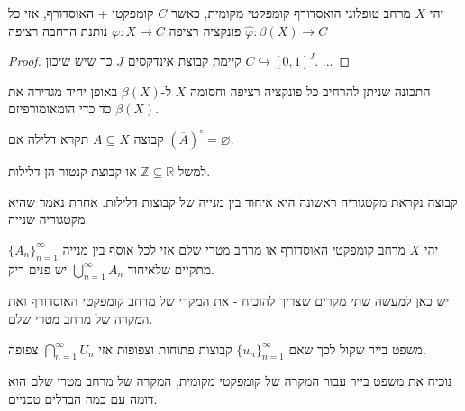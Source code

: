 \documentclass{tstextbook}
\begin{document}
\begin{proposition}
יהי \(X\) מרחב טופלוגי הואסדורף קומפקטי מקומית, כאשר \(C\) קומפקטי + האוסדורף, אזי כל פונקציה רציפה \(\varphi:X\to C\) נותנת הרחבה רציפה \(\hat{\varphi}:\beta(X)\to C\)

\end{proposition}
\begin{proof}
קיימת קבוצת אינדקסים \(J\) כך שיש שיכון \(C\hookrightarrow[0,1]^{J}\). 
...

\end{proof}
\begin{proposition}
התכונה שניתן להרחיב כל פונקציה רציפה וחסומה \(X\) ל-\(\beta(X)\) באופן יחיד מגדירה את \(\beta(X)\) כד כדי הומאומורפיזם.

\end{proposition}
\begin{definition}
קבוצה \(A\subseteq X\) תקרא דלילה אם \((\overline{A})^{\circ}=\varnothing\). 

\end{definition}
\begin{example}
למשל \(\mathbb{Z}\subseteq \mathbb{R}\) או קבוצת קנטור הן דלילות.

\end{example}
\begin{definition}
קבוצה נקראת מקטגוריה ראשונה היא איחוד בין מנייה של קבוצות דלילות. אחרת נאמר שהיא מקטגוריה שנייה.

\end{definition}
\begin{theorem}[בייר]
יהי \(X\) מרחב קומפקטי האוסדורף או מרחב מטרי שלם
אזי לכל אוסף בין מנייה \(\{ A_{n} \}_{n=1}^{\infty}\) מתקיים שלאיחוד \(\bigcup_{n=1}^{\infty}A_{n}\) יש פנים ריק.

\end{theorem}
יש כאן למעשה שתי מקרים שצריך להוכיח - את המקרי של מרחב קומפקטי האוסדורף ואת המקרה של מרחב מטרי שלם. 

\begin{proposition}
משפט בייר שקול לכך שאם \(\{ u_{n} \}_{n=1}^{\infty}\) קבוצות פתוחות וצפופות אזי \(\bigcap_{n=1}^{\infty} U_{n}\) צפופה.

\end{proposition}
נוכיח את משפט בייר עבור המקרה של קומפקטי מקומית, המקרה של מרחב מטרי שלם הוא דומה עם כמה הבדלים טכניים.
\end{document}
